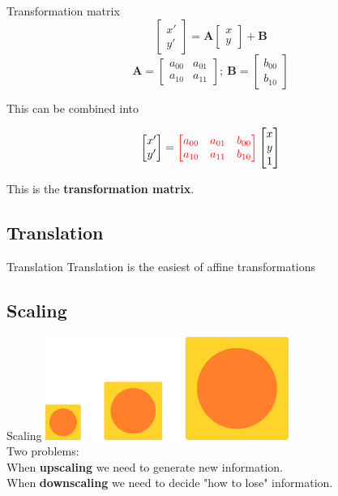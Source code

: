 \documentclass[9pt, aspectratio=169]{beamer}
\begin{document}
\begin{frame}
    {Transformation matrix}
    $$\begin{bmatrix}x'\\y'\end{bmatrix}=\mathbf{A}\begin{bmatrix}x\\y\end{bmatrix}+\mathbf{B}$$
    $$\mathbf{A}=\begin{bmatrix}a_{00}&a_{01}\\a_{10}&a_{11}\end{bmatrix};~\mathbf{B}=\begin{bmatrix}b_{00}\\b_{10}\end{bmatrix}$$

    \begin{center}
        This can be combined into
    \end{center}
    $$\begin{bmatrix}x'\\y'\end{bmatrix}=\color{red}\begin{bmatrix}a_{00}&a_{01}&b_{00}\\a_{10}&a_{11}&b_{10}\end{bmatrix}\color{black}\begin{bmatrix}x\\y\\1\end{bmatrix}$$

    \begin{center}
        This is the \color{red}\textbf{transformation matrix}.
    \end{center}
\end{frame}

\subsection{Translation}

\begin{frame}
    {Translation}
    Translation is the easiest of affine transformations
\end{frame}
\subsection{Scaling}

\begin{frame}
    {Scaling}
    \centering
    \includegraphics[width=.3\textwidth]{scaling.png}\\
    Two problems:\\
    When \textbf{upscaling} we need to generate new information.
    \\
    When \textbf{downscaling} we need to decide "how to lose" information.
\end{frame}
\end{document}
